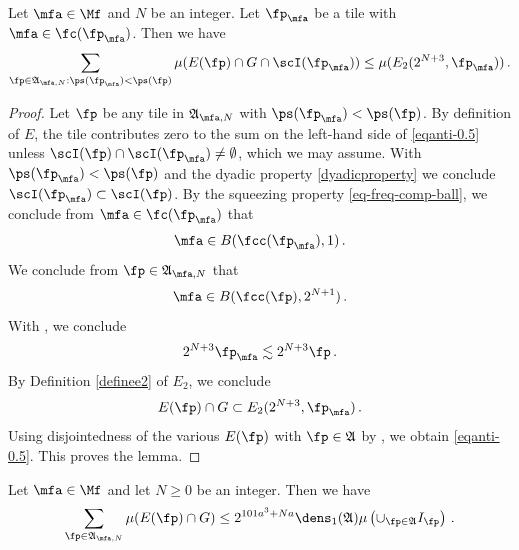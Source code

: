 \begin{lemma}\label{local-antichain-density}
\leanok
{}
Let $\mfa\in\Mf$ and {$N$} be
an integer. Let $\fp_{\mfa}$ be a tile with $\mfa\in \fc(\fp_{\mfa})$.
Then we have
\begin{equation}\label{eqanti-0.5}
    \sum_{\fp\in\mathfrak{A}_{\mfa,N}: \ps(\fp_{\mfa})<\ps(\fp)}\mu(E(\fp)\cap G \cap \scI(\fp_{\mfa}))
    \le \mu (E_2(2^{N+3},\fp_{\mfa}))
 \, .
\end{equation}



\end{lemma}

\begin{proof}


Let $\fp$ be any tile in $\mathfrak{A}_{\mfa,N}$ with $\ps(\fp_{\mfa})<\ps(\fp)$. By definition of
$E$, the tile contributes zero to the sum on the left-hand side of \eqref{eqanti-0.5} unless
 $\scI(\fp)\cap \scI(\fp_{\mfa}) \neq \emptyset$, which we may assume. With $\ps(\fp_{\mfa})<\ps(\fp)$
and the dyadic property
\eqref{dyadicproperty} we conclude $\scI(\fp_{\mfa})\subset \scI(\fp)$.
By the squeezing property
\eqref{eq-freq-comp-ball},
we conclude from
$\mfa\in \fc(\fp_{\mfa})$
that
\begin{equation}
    \mfa\in B(\fcc(\fp_{\mfa}), 1)\, .
\end{equation}
We conclude from $\fp \in \mathfrak{A}_{\mfa,N}$ that
\begin{equation}
    \mfa \in B(\fcc(\fp), 2^{N+1})\, .
\end{equation}
With , we conclude
\begin{equation}
    2^{N+3}\fp_{\mfa} \lesssim 2^{N+3}\fp \, .
\end{equation}
By Definition \eqref{definee2} of $E_2$, we conclude
\begin{equation}
    E(\fp)\cap G \subset E_2(2^{N+3},\fp_{\mfa})\, .
\end{equation}
Using disjointedness of the various $E(\fp)$ with $\fp\in \mathfrak{A}$ by , we obtain \eqref{eqanti-0.5}.
This proves the lemma.
\end{proof}
\begin{lemma}
\label{global-antichain-density}
\leanok
{}
Let $\mfa\in\Mf$ and let $N\ge 0$ be
an integer. Then we have
\begin{equation}\label{eqanti00}
    \sum_{\fp\in\mathfrak{A}_{\mfa,N}}\mu(E(\fp)\cap G)
    \le
 2^{101a^3+Na}\dens_1(\mathfrak{A})\mu\left(\cup_{\fp\in\mathfrak{A}}I_{\fp}\right)\, .
\end{equation}
\end{lemma}



